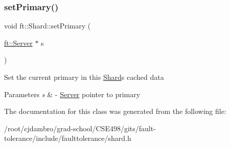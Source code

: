 \subsubsection{\texorpdfstring{set\+Primary()}{setPrimary()}}
{\footnotesize\ttfamily void ft\+::\+Shard\+::set\+Primary (\begin{DoxyParamCaption}\item[{\mbox{\hyperlink{classft_1_1Server}{ft\+::\+Server}} $\ast$}]{s }\end{DoxyParamCaption})\hspace{0.3cm}{\ttfamily [inline]}}

Set the current primary in this \mbox{\hyperlink{classft_1_1Shard}{Shard}}\textquotesingle{}s cached data


\begin{DoxyParams}{Parameters}
{\em s} & -\/ \mbox{\hyperlink{classft_1_1Server}{Server}} pointer to primary \\
\hline
\end{DoxyParams}


The documentation for this class was generated from the following file\+:\begin{DoxyCompactItemize}
\item 
/root/cjdambro/grad-\/school/\+C\+S\+E498/gits/fault-\/tolerance/include/faulttolerance/shard.\+h\end{DoxyCompactItemize}
